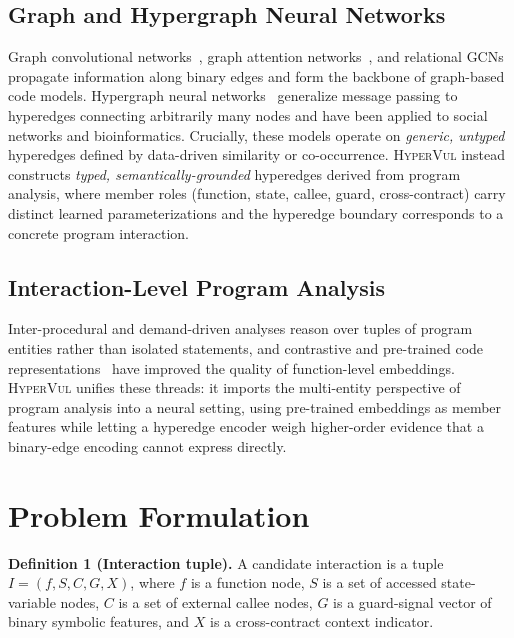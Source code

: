 \documentclass[conference]{IEEEtran}
\newcommand{\hypervul}{\textsc{HyperVul}}
\begin{document}
\subsection{Graph and Hypergraph Neural Networks}
Graph convolutional networks~\cite{kipf2017gcn}, graph attention
networks~\cite{velickovic2018gat}, and relational GCNs~\cite{schlichtkrull2018rgcn}
propagate information along binary edges and form the backbone of graph-based code
models. Hypergraph neural networks~\cite{feng2019hgnn,yadati2019hypergcn} generalize
message passing to hyperedges connecting arbitrarily many nodes and have been applied
to social networks and bioinformatics. Crucially, these models operate on
\emph{generic, untyped} hyperedges defined by data-driven similarity or co-occurrence.
\hypervul{} instead constructs \emph{typed, semantically-grounded} hyperedges derived
from program analysis, where member roles (function, state, callee, guard,
cross-contract) carry distinct learned parameterizations and the hyperedge boundary
corresponds to a concrete program interaction.

\subsection{Interaction-Level Program Analysis}
Inter-procedural and demand-driven analyses reason over tuples of program entities
rather than isolated statements, and contrastive and pre-trained code
representations~\cite{guo2022unixcoder} have improved the quality of function-level
embeddings. \hypervul{} unifies these threads: it imports the multi-entity
perspective of program analysis into a neural setting, using pre-trained embeddings as
member features while letting a hyperedge encoder weigh higher-order evidence that a
binary-edge encoding cannot express directly.

\section{Problem Formulation}
\label{sec:problem}

\noindent\textbf{Definition 1 (Interaction tuple).} A candidate interaction is a
tuple $I = (f, S, C, G, X)$, where $f$ is a function node, $S$ is a set of accessed
state-variable nodes, $C$ is a set of external callee nodes, $G$ is a guard-signal
vector of binary symbolic features, and $X$ is a cross-contract context indicator.
\end{document}
